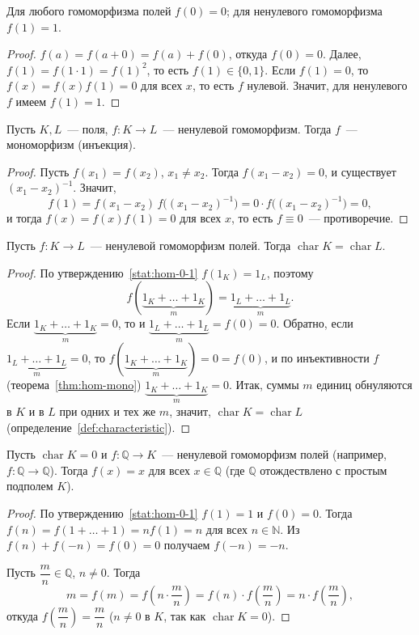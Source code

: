 \documentclass[12pt]{article}
\begin{document}
	\begin{statement}\label{stat:hom-0-1}
		Для любого гомоморфизма полей $f(0) = 0$; для ненулевого гомоморфизма $f(1) = 1$.
	\end{statement}
	\begin{proof}
		$f(a) = f(a + 0) = f(a) + f(0)$, откуда $f(0) = 0$. Далее, $f(1) = f(1 \cdot 1) = f(1)^2$, то есть $f(1) \in \{0, 1\}$. Если $f(1) = 0$, то $f(x) = f(x)f(1) = 0$ для всех $x$, то есть $f$ нулевой. Значит, для ненулевого $f$ имеем $f(1) = 1$.
	\end{proof}

	\begin{theorem}\label{thm:hom-mono}
		Пусть $K, L$~--- поля, $f: K \to L$~--- ненулевой гомоморфизм. Тогда $f$~--- мономорфизм (инъекция).
	\end{theorem}
	\begin{proof}
		Пусть $f(x_1) = f(x_2)$, $x_1 \ne x_2$. Тогда $f(x_1 - x_2) = 0$, и существует $(x_1 - x_2)^{-1}$. Значит,
		\[
			f(1) = f(x_1 - x_2)\,f\bigl((x_1 - x_2)^{-1}\bigr) = 0 \cdot f\bigl((x_1 - x_2)^{-1}\bigr) = 0,
		\]
		и тогда $f(x) = f(x)f(1) = 0$ для всех $x$, то есть $f \equiv 0$~--- противоречие.
	\end{proof}

	\begin{theorem}\label{thm:hom-char}
		Пусть $f: K \to L$~--- ненулевой гомоморфизм полей. Тогда $\operatorname{char} K = \operatorname{char} L$.
	\end{theorem}
	\begin{proof}
		По утверждению~\ref{stat:hom-0-1} $f(1_K) = 1_L$, поэтому
		\[
			f(\underbrace{1_K + \ldots + 1_K}_{m}) = \underbrace{1_L + \ldots + 1_L}_{m}.
		\]
		Если $\underbrace{1_K + \ldots + 1_K}_{m} = 0$, то и $\underbrace{1_L + \ldots + 1_L}_{m} = f(0) = 0$. Обратно, если $\underbrace{1_L + \ldots + 1_L}_{m} = 0$, то $f(\underbrace{1_K + \ldots + 1_K}_{m}) = 0 = f(0)$, и по инъективности $f$ (теорема~\ref{thm:hom-mono}) $\underbrace{1_K + \ldots + 1_K}_{m} = 0$. Итак, суммы $m$ единиц обнуляются в $K$ и в $L$ при одних и тех же $m$, значит, $\operatorname{char} K = \operatorname{char} L$ (определение~\ref{def:characteristic}).
	\end{proof}

	\begin{statement}\label{stat:q-hom-id}
		Пусть $\operatorname{char} K = 0$ и $f: \mathbb{Q} \to K$~--- ненулевой гомоморфизм полей (например, $f: \mathbb{Q} \to \mathbb{Q}$). Тогда $f(x) = x$ для всех $x \in \mathbb{Q}$ (где $\mathbb{Q}$ отождествлено с простым подполем $K$).
	\end{statement}
	\begin{proof}
		По утверждению~\ref{stat:hom-0-1} $f(1)=1$ и $f(0)=0$. Тогда $f(n) = f(1 + \ldots + 1) = n f(1) = n$ для всех $n \in \mathbb{N}$. Из $f(n)+f(-n) = f(0) = 0$ получаем $f(-n)=-n$.

		Пусть $\dfrac{m}{n} \in \mathbb{Q}$, $n \ne 0$. Тогда
		\[
			m = f(m) = f\!\left(n \cdot \frac{m}{n}\right) = f(n) \cdot f\!\left(\frac{m}{n}\right) = n \cdot f\!\left(\frac{m}{n}\right),
		\]
		откуда $f\!\left(\dfrac{m}{n}\right) = \dfrac{m}{n}$ ($n \ne 0$ в $K$, так как $\operatorname{char} K = 0$).
	\end{proof}
\end{document}
